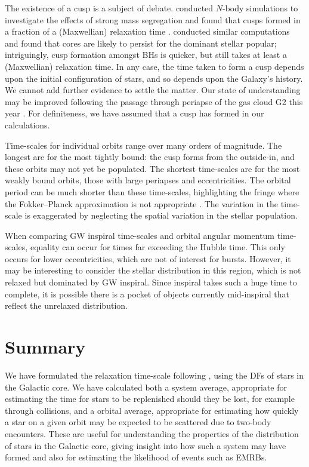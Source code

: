 The existence of a cusp is a subject of debate. \citet{Preto2010} conducted $N$-body simulations to investigate the effects of strong mass segregation \citep{Alexander2009, Keshet2009} and found that cusps formed in a fraction of a (Maxwellian) relaxation time \citep{Amaro-Seoane2011}. \citet{Gualandris2012} conducted similar computations and found that cores are likely to persist for the dominant stellar popular; intriguingly, cusp formation amongst BHs is quicker, but still takes at least a (Maxwellian) relaxation time. In any case, the time taken to form a cusp depends upon the initial configuration of stars, and so depends upon the Galaxy's history. We cannot add further evidence to settle the matter. Our state of understanding may be improved following the passage through periapse of the gas cloud G2 this year \citep{Bartos2013}. For definiteness, we have assumed that a cusp has formed in our calculations.

Time-scales for individual orbits range over many orders of magnitude. The longest are for the most tightly bound: the cusp forms from the outside-in, and these orbits may not yet be populated. The shortest time-scales are for the most weakly bound orbits, those with large periapses and eccentricities. The orbital period can be much shorter than these time-scales, highlighting the fringe where the Fokker--Planck approximation is not appropriate \citep{Spitzer1972}. The variation in the time-scale is exaggerated by neglecting the spatial variation in the stellar population.

When comparing GW inspiral time-scales and orbital angular momentum time-scales, equality can occur for times far exceeding the Hubble time. This only occurs for lower eccentricities, which are not of interest for bursts. However, it may be interesting to consider the stellar distribution in this region, which is not relaxed but dominated by GW inspiral. Since inspiral takes such a huge time to complete, it is possible there is a pocket of objects currently mid-inspiral that reflect the unrelaxed distribution.

\section{Summary}

We have formulated the relaxation time-scale following \citet{Chandrasekhar1960}, using the DFs of stars in the Galactic core. We have calculated both a system average, appropriate for estimating the time for stars to be replenished should they be lost, for example through collisions, and a orbital average, appropriate for estimating how quickly a star on a given orbit may be expected to be scattered due to two-body encounters. These are useful for understanding the properties of the distribution of stars in the Galactic core, giving insight into how such a system may have formed and also for estimating the likelihood of events such as EMRBs.

